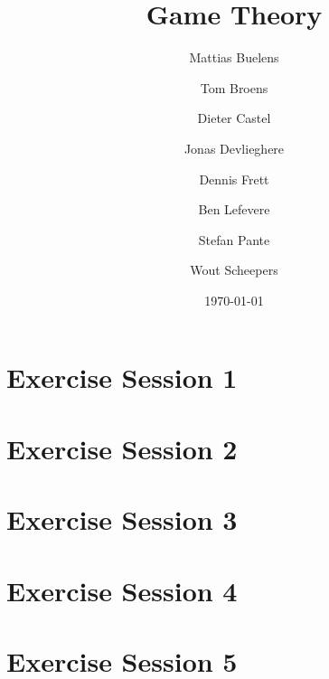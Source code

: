 \documentclass[a4paper, 10pt, oneside]{article}
\title{Game Theory}
\date{\today}
\author{Mattias Buelens \and Tom Broens \and Dieter Castel \and Jonas
Devlieghere \and Dennis Frett \and Ben Lefevere \and Stefan Pante \and Wout Scheepers}
\theoremstyle{plain}
\numberwithin{question}{section}
\numberwithin{solution}{section}
\begin{document}
\maketitle

\tableofcontents

\newpage

\section{Exercise Session 1}


\section{Exercise Session 2}


\section{Exercise Session 3}


\section{Exercise Session 4}


\section{Exercise Session 5}


\nocite{*}
\printbibliography
\end{document}
